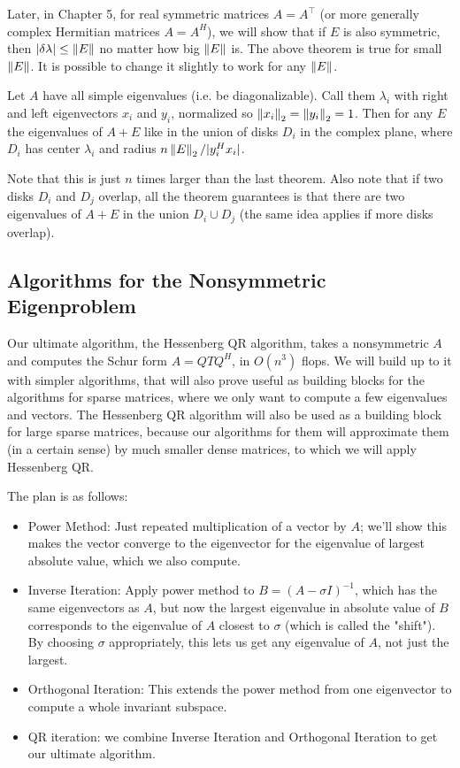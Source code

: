 \documentclass[11pt]{article}
\numberwithin{equation}{section}
\begin{document}
Later, in Chapter 5, for real symmetric matrices $A=A^{\top}$ (or more generally complex Hermitian matrices $A = A^H$), we will show that if $E$ is also symmetric, 
then $| \delta\lambda | \leq \left\| E \right\|$ no matter how big $\left\| E \right\|$ is. The above theorem is true for small $\left\| E \right\|$. 
It is possible to change it slightly to work for any $\left\| E \right\|$.

\begin{theorem}
    Let $A$ have all simple eigenvalues (i.e. be diagonalizable). Call them $\lambda_i$ with right and left eigenvectors $x_i$ and $y_i$,
    normalized so $\left\| x_i \right\|_2 = \left\| y_i \right\|_2 = 1$. Then for any $E$ the eigenvalues of $A+E$ like in the union of disks $D_i$ in the complex plane, 
    where $D_i$ has center $\lambda_i$ and radius $n\left\| E \right\|_2 / |y_i^H x_i|$.
\end{theorem}

Note that this is just $n$ times larger than the last theorem. Also note that if two disks $D_i$ and $D_j$ overlap, 
all the theorem guarantees is that there are two eigenvalues of $A+E$ in the union $D_i \cup D_j$ (the same idea applies if more disks overlap).

\subsection{Algorithms for the Nonsymmetric Eigenproblem}

Our ultimate algorithm, the Hessenberg QR algorithm, takes a nonsymmetric $A$ and computes the Schur form $A = Q T Q^H$, in $O(n^3)$ flops. 
We will build up to it with simpler algorithms, that will also prove useful as building blocks for the algorithms for sparse matrices, 
where we only want to compute a few eigenvalues and vectors. The Hessenberg QR algorithm will also be used as a building block for large sparse matrices, 
because our algorithms for them will approximate them (in a certain sense) by much smaller dense matrices, to which we will apply Hessenberg QR.

The plan is as follows:
\begin{itemize}
    \item Power Method: Just repeated multiplication of a vector by $A$; we'll show this makes the vector converge to the eigenvector for the eigenvalue
    of largest absolute value, which we also compute.
    \item Inverse Iteration: Apply power method to $B = (A - \sigma I)^{-1}$, which has the same eigenvectors as $A$, 
    but now the largest eigenvalue in absolute value of $B$ corresponds to the eigenvalue of $A$ closest to $\sigma$ (which is called the "shift"). 
    By choosing $\sigma$ appropriately, this lets us get any eigenvalue of $A$, not just the largest.
    \item Orthogonal Iteration: This extends the power method from one eigenvector to compute a whole invariant subspace.
    \item QR iteration: we combine Inverse Iteration and Orthogonal Iteration to get our ultimate algorithm.
\end{itemize}
\end{document}
